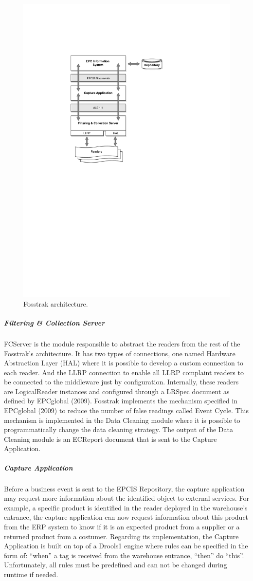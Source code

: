 \begin{figure}[ht!]
  \centering
  \includegraphics[width=.725\textwidth]{./images/fosstrak_architecture}
  \caption{Fosstrak architecture.}
  \label{fig:fosstrak_architecture}
\end{figure}

\subparagraph{Filtering \& Collection Server}
FCServer is the module responsible to abstract the readers from the rest of the Fosstrak’s architecture.
It has two types of connections, one named Hardware Abstraction Layer (HAL) where it is possible to
develop a custom connection to each reader. And the LLRP connection to enable all LLRP complaint
readers to be connected to the middleware just by configuration. Internally, these readers are
LogicalReader instances and configured through a LRSpec document as defined by EPCglobal (2009).
Fosstrak implements the mechanism specified in EPCglobal (2009) to reduce the number of false readings
called Event Cycle. This mechanism is implemented in the Data Cleaning module where it is possible to
programmatically change the data cleaning strategy. The output of the Data Cleaning module is an
ECReport document that is sent to the Capture Application.

\subparagraph{Capture Application}
Before a business event is sent to the EPCIS Repository, the capture application
may request more information about the identified object to external services. For example, a
specific product is identified in the reader deployed in the warehouse’s entrance, the capture
application can now request information about this product from the ERP system to know if it is an
expected product from a supplier or a returned product from a costumer. Regarding its implementation,
the Capture Application is built on top of a Drools1 engine where rules can be specified in the form of:
“when” a tag is received from the warehouse entrance, “then” do “this”. Unfortunately, all rules must
be predefined and can not be changed during runtime if needed.

